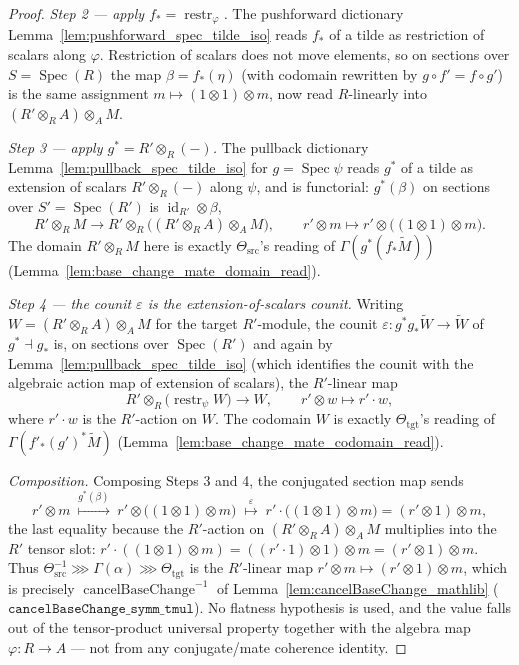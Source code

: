 \begin{proof}
  \emph{Step 2 — apply \(f_* = \operatorname{restr}_\varphi\).} The pushforward
  dictionary Lemma~\ref{lem:pushforward_spec_tilde_iso} reads \(f_*\) of a tilde as
  restriction of scalars along \(\varphi\). Restriction of scalars does not move
  elements, so on sections over \(S = \operatorname{Spec}(R)\) the map
  \(\beta = f_*(\eta)\) (with codomain rewritten by \(g \circ f' = f \circ g'\)) is the
  same assignment \(m \mapsto (1 \otimes 1) \otimes m\), now read \(R\)-linearly into
  \((R' \otimes_R A) \otimes_A M\).

  \emph{Step 3 — apply \(g^* = R' \otimes_R (-)\).} The pullback dictionary
  Lemma~\ref{lem:pullback_spec_tilde_iso} for \(g = \operatorname{Spec}\psi\) reads
  \(g^*\) of a tilde as extension of scalars \(R' \otimes_R (-)\) along \(\psi\), and is
  functorial: \(g^*(\beta)\) on sections over \(S' = \operatorname{Spec}(R')\) is
  \(\operatorname{id}_{R'} \otimes \beta\),
  \[
    R' \otimes_R M \longrightarrow R' \otimes_R \bigl((R' \otimes_R A) \otimes_A M\bigr),
    \qquad
    r' \otimes m \longmapsto r' \otimes \bigl((1 \otimes 1) \otimes m\bigr).
  \]
  The domain \(R' \otimes_R M\) here is exactly \(\Theta_{\mathrm{src}}\)'s reading of
  \(\Gamma(g^*(f_*\widetilde M))\) (Lemma~\ref{lem:base_change_mate_domain_read}).

  \emph{Step 4 — the counit \(\varepsilon\) is the extension-of-scalars counit.}
  Writing \(W = (R' \otimes_R A) \otimes_A M\) for the target \(R'\)-module, the counit
  \(\varepsilon : g^* g_* \widetilde W \to \widetilde W\) of \(g^* \dashv g_*\) is, on
  sections over \(\operatorname{Spec}(R')\) and again by
  Lemma~\ref{lem:pullback_spec_tilde_iso} (which identifies the counit with the
  algebraic action map of extension of scalars), the \(R'\)-linear map
  \[
    R' \otimes_R \bigl(\operatorname{restr}_\psi W\bigr) \longrightarrow W,
    \qquad r' \otimes w \longmapsto r' \cdot w ,
  \]
  where \(r' \cdot w\) is the \(R'\)-action on \(W\). The codomain \(W\) is exactly
  \(\Theta_{\mathrm{tgt}}\)'s reading of \(\Gamma(f'_*(g')^*\widetilde M)\)
  (Lemma~\ref{lem:base_change_mate_codomain_read}).

  \emph{Composition.} Composing Steps 3 and 4, the conjugated section map sends
  \[
    r' \otimes m
    \;\overset{g^*(\beta)}{\longmapsto}\;
    r' \otimes \bigl((1 \otimes 1) \otimes m\bigr)
    \;\overset{\varepsilon}{\longmapsto}\;
    r' \cdot \bigl((1 \otimes 1) \otimes m\bigr)
    = (r' \otimes 1) \otimes m ,
  \]
  the last equality because the \(R'\)-action on \((R' \otimes_R A) \otimes_A M\)
  multiplies into the \(R'\) tensor slot: \(r' \cdot ((1 \otimes 1) \otimes m)
  = ((r' \cdot 1) \otimes 1) \otimes m = (r' \otimes 1) \otimes m\). Thus
  \(\Theta_{\mathrm{src}}^{-1} \ggg \Gamma(\alpha) \ggg \Theta_{\mathrm{tgt}}\) is the
  \(R'\)-linear map \(r' \otimes m \mapsto (r' \otimes 1) \otimes m\), which is
  precisely \(\operatorname{cancelBaseChange}^{-1}\) of
  Lemma~\ref{lem:cancelBaseChange_mathlib}
  (\(\mathtt{cancelBaseChange\_symm\_tmul}\)). No flatness hypothesis is used, and the
  value falls out of the tensor-product universal property together with the algebra
  map \(\varphi : R \to A\) — not from any conjugate/mate coherence identity.


\end{proof}
